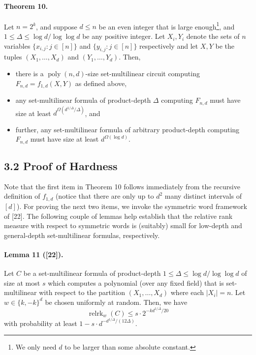\documentclass[10pt,a4paper]{article}
\begin{document}
\paragraph{Theorem 10.} Let $n=2^k$, and suppose $d\leq n$ be an even integer that is large enough\footnote{We only need $d$ to be larger than some absolute constant.}, and $1\leq\Delta\leq\log d/\log\log d$ be any positive integer. Let $X_i,Y_i$ denote the sets of $n$ variables $\{x_{i,j}:j\in[n]\}$ and $\{y_{i,j}:j\in[n]\}$ respectively and let $X,Y$ be the tuples $(X_1,\ldots,X_d)$ and $(Y_1,\ldots,Y_d)$. Then,
\begin{itemize}
\item there is a $\operatorname{poly}(n,d)$-size set-multilinear circuit computing $F_{n,d}=f_{1,d}(X,Y)$ as defined above,
\item any set-multilinear formula of product-depth $\Delta$ computing $F_{n,d}$ must have size at least $d^{\Omega(d^{1/\Delta}/\Delta)}$, and
\item further, any set-multilinear formula of arbitrary product-depth computing $F_{n,d}$ must have size at least $d^{\Omega(\log d)}$.
\end{itemize}

\subsection*{3.2 Proof of Hardness}
Note that the first item in Theorem 10 follows immediately from the recursive definition of $f_{1,d}$ (notice that there are only up to $d^2$ many distinct intervals of $[d]$). For proving the next two items, we invoke the symmetric word framework of [22]. The following couple of lemmas help establish that the relative rank measure with respect to symmetric words is (suitably) small for low-depth and general-depth set-multilinear formulas, respectively.
\paragraph{Lemma 11 ([22]).} Let $C$ be a set-multilinear formula of product-depth $1\leq\Delta\leq\log d/\log\log d$ of size at most $s$ which computes a polynomial (over any fixed field) that is set-multilinear with respect to the partition $(X_1,\ldots,X_d)$ where each $|X_i|=n$. Let $w\in\{k,-k\}^d$ be chosen uniformly at random. Then, we have
\[\operatorname{relrk}_w(C)\leq s\cdot2^{-kd^{1/\Delta}/20}\]
with probability at least $1-s\cdot d^{-d^{1/\Delta}/(12\Delta)}$.
\end{document}
